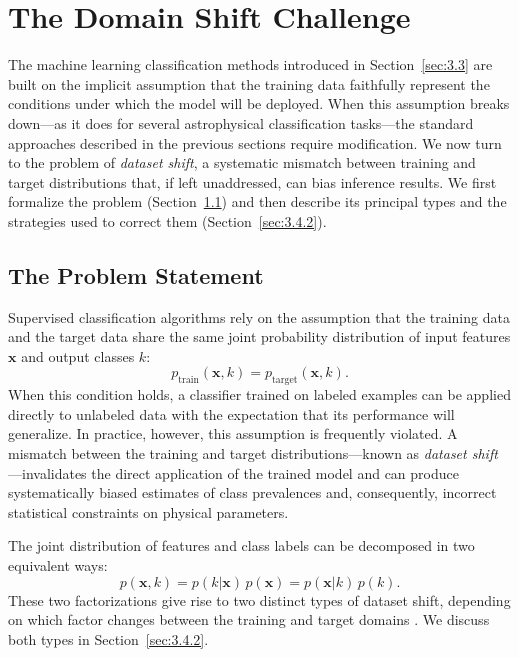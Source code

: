 \section{The Domain Shift Challenge}
\label{sec:3.4}

The machine learning classification methods introduced in Section~\ref{sec:3.3} are built on the implicit assumption that the training data faithfully represent the conditions under which the model will be deployed.
When this assumption breaks down---as it does for several astrophysical classification tasks---the standard approaches described in the previous sections require modification.
We now turn to the problem of \textit{dataset shift}, a systematic mismatch between training and target distributions that, if left unaddressed, can bias inference results.
We first formalize the problem (Section~\ref{sec:3.4.1}) and then describe its principal types and the strategies used to correct them (Section~\ref{sec:3.4.2}).

\subsection{The Problem Statement}
\label{sec:3.4.1}

Supervised classification algorithms rely on the assumption that the training data and the target data share the same joint probability distribution of input features $\mathbf{x}$ and output classes $k$:
\begin{equation}
	p_{\text{train}}(\mathbf{x}, k) = p_{\text{target}}(\mathbf{x}, k).
	\label{eq:dataset_shift_assumption}
\end{equation}
When this condition holds, a classifier trained on labeled examples can be applied directly to unlabeled data with the expectation that its performance will generalize.
In practice, however, this assumption is frequently violated.
A mismatch between the training and target distributions---known as \textit{dataset shift} \cite{MorenoTorres2012AUV}---invalidates the direct application of the trained model and can produce systematically biased estimates of class prevalences and, consequently, incorrect statistical constraints on physical parameters.

The joint distribution of features and class labels can be decomposed in two equivalent ways:
\begin{equation}
	p(\mathbf{x}, k) = p(k|\mathbf{x})\,p(\mathbf{x}) = p(\mathbf{x}|k)\,p(k).
	\label{eq:joint_factorizations}
\end{equation}
These two factorizations give rise to two distinct types of dataset shift, depending on which factor changes between the training and target domains \cite{MorenoTorres2012AUV}.
We discuss both types in Section~\ref{sec:3.4.2}.

